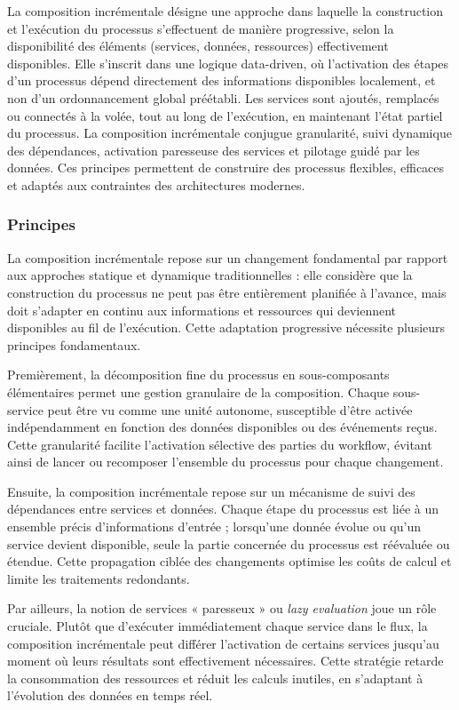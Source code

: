 La composition incrémentale désigne une approche dans laquelle la construction et l’exécution du processus s'effectuent de manière progressive, selon la disponibilité des éléments (services, données, ressources) effectivement disponibles. Elle s'inscrit dans une logique data-driven, où l’activation des étapes d’un processus dépend directement des informations disponibles localement, et non d’un ordonnancement global préétabli. Les services sont ajoutés, remplacés ou connectés à la volée, tout au long de l'exécution, en maintenant l’état partiel du processus. La composition incrémentale conjugue granularité, suivi dynamique des dépendances, activation paresseuse des services et pilotage guidé par les données. Ces principes permettent de construire des processus flexibles, efficaces et adaptés aux contraintes des architectures modernes.

\subsubsection{Principes}
La composition incrémentale repose sur un changement fondamental par rapport aux approches statique et dynamique traditionnelles : elle considère que la construction du processus ne peut pas être entièrement planifiée à l’avance, mais doit s’adapter en continu aux informations et ressources qui deviennent disponibles au fil de l’exécution. Cette adaptation progressive nécessite plusieurs principes fondamentaux.

Premièrement, la décomposition fine du processus en sous-composants élémentaires permet une gestion granulaire de la composition. Chaque sous-service peut être vu comme une unité autonome, susceptible d’être activée indépendamment en fonction des données disponibles ou des événements reçus. Cette granularité facilite l’activation sélective des parties du workflow, évitant ainsi de lancer ou recomposer l’ensemble du processus pour chaque changement.

Ensuite, la composition incrémentale repose sur un mécanisme de suivi des dépendances entre services et données. Chaque étape du processus est liée à un ensemble précis d’informations d’entrée ; lorsqu’une donnée évolue ou qu’un service devient disponible, seule la partie concernée du processus est réévaluée ou étendue. Cette propagation ciblée des changements optimise les coûts de calcul et limite les traitements redondants.

Par ailleurs, la notion de services « paresseux » ou \textit{lazy evaluation} joue un rôle cruciale. Plutôt que d’exécuter immédiatement chaque service dans le flux, la composition incrémentale peut différer l’activation de certains services jusqu’au moment où leurs résultats sont effectivement nécessaires. Cette stratégie retarde la consommation des ressources et réduit les calculs inutiles, en s’adaptant à l’évolution des données en temps réel.

